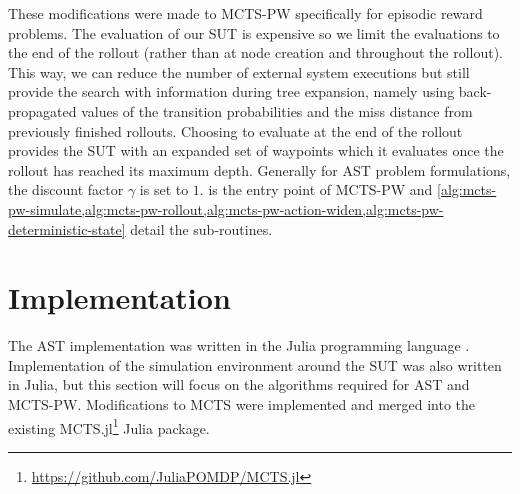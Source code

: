 These modifications were made to MCTS-PW specifically for episodic reward problems.
The evaluation of our SUT is expensive so we limit the evaluations to the end of the rollout (rather than at node creation and throughout the rollout).
This way, we can reduce the number of external system executions but still provide the search with information during tree expansion, namely using back-propagated values of the transition probabilities and the miss distance from previously finished rollouts.
Choosing to evaluate at the end of the rollout provides the SUT with an expanded set of waypoints which it evaluates once the rollout has reached its maximum depth.
Generally for AST problem formulations, the discount factor $\gamma$ is set to $1$.
 is the entry point of MCTS-PW and \cref{alg:mcts-pw-simulate,alg:mcts-pw-rollout,alg:mcts-pw-action-widen,alg:mcts-pw-deterministic-state} detail the sub-routines.




\section{Implementation}
\label{sec:ast_implementation}
The AST implementation was written in the Julia programming language \cite{bezanson2017julia}.
Implementation of the simulation environment around the SUT was also written in Julia, but this section will focus on the algorithms required for AST and MCTS-PW.
Modifications to MCTS were implemented and merged into the existing MCTS.jl\footnote{\url{https://github.com/JuliaPOMDP/MCTS.jl}} Julia package.





